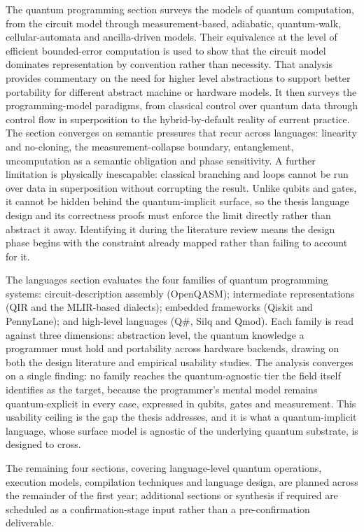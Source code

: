 The quantum programming section surveys the models of quantum computation, from the circuit model through measurement-based, adiabatic, quantum-walk, cellular-automata and ancilla-driven models.
Their equivalence at the level of efficient bounded-error computation is used to show that the circuit model dominates representation by convention rather than necessity.
That analysis provides commentary on the need for higher level abstractions to support better portability for different abstract machine or hardware models.
It then surveys the programming-model paradigms, from classical control over quantum data through control flow in superposition to the hybrid-by-default reality of current practice.
The section converges on semantic pressures that recur across languages: linearity and no-cloning, the measurement-collapse boundary, entanglement, uncomputation as a semantic obligation and phase sensitivity.
A further limitation is physically inescapable: classical branching and loops cannot be run over data in superposition without corrupting the result.
Unlike qubits and gates, it cannot be hidden behind the quantum-implicit surface, so the thesis language design and its correctness proofs must enforce the limit directly rather than abstract it away.
Identifying it during the literature review means the design phase begins with the constraint already mapped rather than failing to account for it.

The languages section evaluates the four families of quantum programming systems: circuit-description assembly (OpenQASM); intermediate representations (QIR and the MLIR-based dialects); embedded frameworks (Qiskit and PennyLane); and high-level languages (Q\#, Silq and Qmod).
Each family is read against three dimensions: abstraction level, the quantum knowledge a programmer must hold and portability across hardware backends, drawing on both the design literature and empirical usability studies.
The analysis converges on a single finding: no family reaches the quantum-agnostic tier the field itself identifies as the target, because the programmer's mental model remains quantum-explicit in every case, expressed in qubits, gates and measurement.
This usability ceiling is the gap the thesis addresses, and it is what a quantum-implicit language, whose surface model is agnostic of the underlying quantum substrate, is designed to cross.

The remaining four sections, covering language-level quantum operations, execution models, compilation techniques and language design, are planned across the remainder of the first year; additional sections or synthesis if required are scheduled as a confirmation-stage input rather than a pre-confirmation deliverable.

